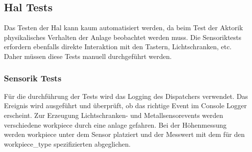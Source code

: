 





\subsection{Hal Tests}\label{subsec:hal-tests}

Das Testen der Hal kann kaum automatisiert werden, da beim Test der Aktorik physikalisches Verhalten der Anlage beobachtet werden muss.
Die Sensoriktests erfordern ebenfalls direkte Interaktion mit den Tastern, Lichtschranken, etc.
Daher müssen diese Tests manuell durchgeführt werden.

\subsubsection{Sensorik Tests}\label{subsubsec:sensorik-tests}
Für die durchführung der Tests wird das Logging des Dispatchers verwendet.
Das Ereignis wird ausgeführt und überprüft, ob das richtige Event im Console Logger erscheint.
Zur Erzeugung Lichtschranken- und Metallsensorevents werden verschiedene \gls{workpiece} durch eine \gls{anlage} gefahren.
Bei der Höhenmessung werden \gls{workpiece} unter dem Sensor platziert und der Messwert mit dem für den \gls{workpiece_type}
spezifizierten abgeglichen.

